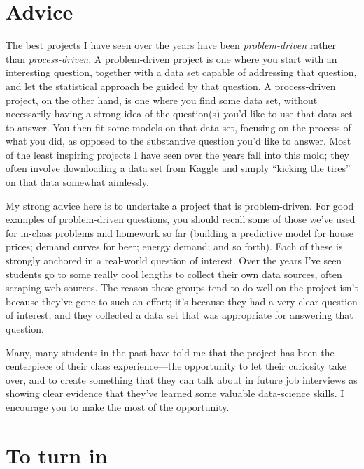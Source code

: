 \documentclass{mynotes}
\begin{document}
\section{Advice}

The best projects I have seen over the years have been \textit{problem-driven} rather than \textit{process-driven}.  A problem-driven project is one where you start with an interesting question, together with a data set capable of addressing that question, and let the statistical approach be guided by that question.  A process-driven project, on the other hand, is one where you find some data set, without necessarily having a strong idea of the question(s) you'd like to use that data set to answer.  You then fit some models on that data set, focusing on the process of what you did, as opposed to the substantive question you'd like to answer.  Most of the least inspiring projects I have seen over the years fall into this mold; they often involve downloading a data set from Kaggle and simply ``kicking the tires'' on that data somewhat aimlessly.  

My strong advice here is to undertake a project that is problem-driven.  For good examples of problem-driven questions, you should recall some of those we've used for in-class problems and homework so far (building a predictive model for house prices; demand curves for beer; energy demand; and so forth).  Each of these is strongly anchored in a real-world question of interest.  Over the years I've seen students go to some really cool lengths to collect their own data sources, often scraping web sources.  The reason these groups tend to do well on the project isn't because they've gone to such an effort; it's because they had a very clear question of interest, and they collected a data set that was appropriate for answering that question.

Many, many students in the past have told me that the project has been the centerpiece of their class experience---the opportunity to let their curiosity take over, and to create something that they can talk about in future job interviews as showing clear evidence that they've learned some valuable data-science skills.  I encourage you to make the most of the opportunity.

\section{To turn in}
\end{document}
